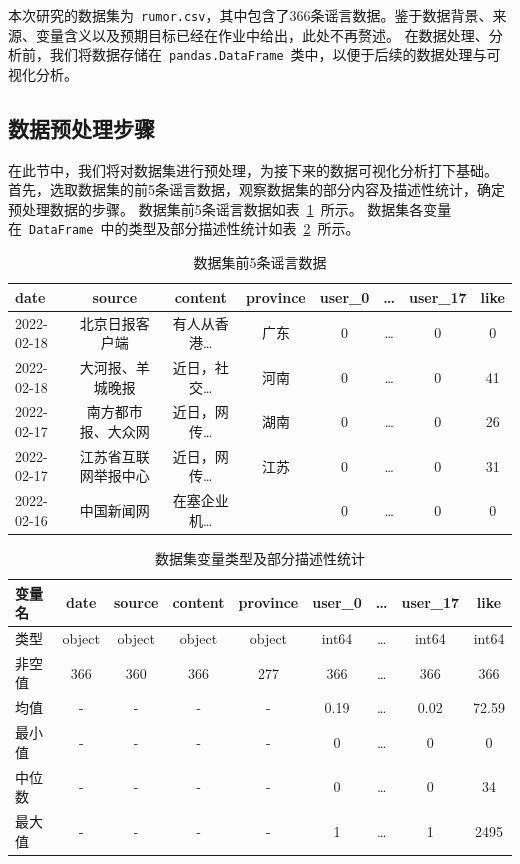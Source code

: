 本次研究的数据集为~\verb|rumor.csv|，其中包含了366条谣言数据。鉴于数据背景、来源、变量含义以及预期目标已经在作业中给出，此处不再赘述。
在数据处理、分析前，我们将数据存储在~\verb|pandas.DataFrame|~类中，以便于后续的数据处理与可视化分析。

\subsection{数据预处理步骤}

在此节中，我们将对数据集进行预处理，为接下来的数据可视化分析打下基础。
首先，选取数据集的前5条谣言数据，观察数据集的部分内容及描述性统计，确定预处理数据的步骤。
数据集前5条谣言数据如表~\ref{tab:datasetContent}~所示。
数据集各变量在~\verb|DataFrame|~中的类型及部分描述性统计如表~\ref{tab:datasetVariable}~所示。

\begin{table}[!ht] \centering
    \begin{tabularx}{\linewidth}{X c c c c c c c}
        \toprule
        date & source & content & province & user\_0 & \dots & user\_17 & like \\
        \midrule
        2022-02-18 & 北京日报客户端 & 有人从香港\dots & 广东 & 0 & \dots & 0 & 0 \\
        2022-02-18 & 大河报、羊城晚报 & 近日，社交\dots & 河南 & 0 & \dots & 0 & 41 \\
        2022-02-17 & 南方都市报、大众网 & 近日，网传\dots & 湖南 & 0 & \dots & 0 & 26 \\
        2022-02-17 & 江苏省互联网举报中心 & 近日，网传\dots & 江苏 & 0 & \dots & 0 & 31 \\
        2022-02-16 & 中国新闻网 & 在塞企业机\dots & \color{red}{NaN} & 0 & \dots & 0 & 0 \\
        \bottomrule
    \end{tabularx}
    \caption{数据集前5条谣言数据}
    \label{tab:datasetContent}
\end{table}

\begin{table}[!ht] \centering
    \begin{tabularx}{\linewidth}{X c c c c c c c c}
        \toprule
        变量名 & date & source & content & province & user\_0 & \dots & user\_17 & like \\
        \midrule
        类型 & object & object & object & object & int64 & \dots & int64 & int64 \\
        非空值 & 366 & 360 & 366 & 277 & 366 & \dots & 366 & 366 \\
        均值 & - & - & - & - & 0.19 & \dots & 0.02 & 72.59 \\
        最小值 & - & - & - & - & 0 & \dots & 0 & 0 \\
        中位数 & - & - & - & - & 0 & \dots & 0 & 34 \\
        最大值 & - & - & - & - & 1 & \dots & 1 & 2495 \\
        \bottomrule
    \end{tabularx}
    \caption{数据集变量类型及部分描述性统计}
    \label{tab:datasetVariable}
\end{table}


